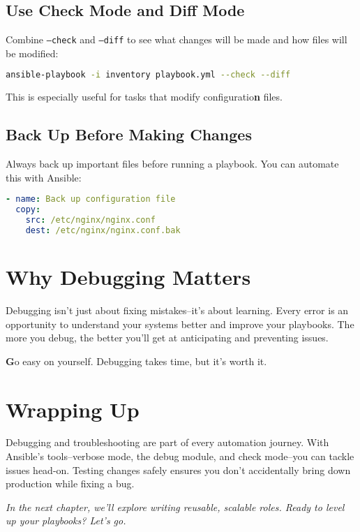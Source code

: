 \subsection{Use Check Mode and Diff Mode}

Combine \texttt{--check} and \texttt{--diff} to see what changes will be made and how files will be modified:
\begin{lstlisting}[language=bash, caption=Using Check and Diff Modes]
ansible-playbook -i inventory playbook.yml --check --diff
\end{lstlisting}

This is especially useful for tasks that modify configuratio\textbf{n} files.

\subsection{Back Up Before Making Changes}

Always back up important files before running a playbook. You can automate this with Ansible:
\begin{lstlisting}[language=yaml, caption=Backing Up a File]
- name: Back up configuration file
  copy:
    src: /etc/nginx/nginx.conf
    dest: /etc/nginx/nginx.conf.bak
\end{lstlisting}


\section{Why Debugging Matters}

Debugging isn't just about fixing mistakes--it's about learning. Every error is an opportunity to understand your systems better and improve your playbooks. The more you debug, the better you'll get at anticipating and preventing issues.

\textbf{G}o easy on yourself. Debugging takes time, but it's worth it.


\section{Wrapping Up}

Debugging and troubleshooting are part of every automation journey. With Ansible's tools--verbose mode, the debug module, and check mode--you can tackle issues head-on. Testing changes safely ensures you don't accidentally bring down production while fixing a bug.

\vspace{1em}

\textit{In the next chapter, we'll explore writing reusable, scalable roles. Ready to level up your playbooks? Let's go.}
